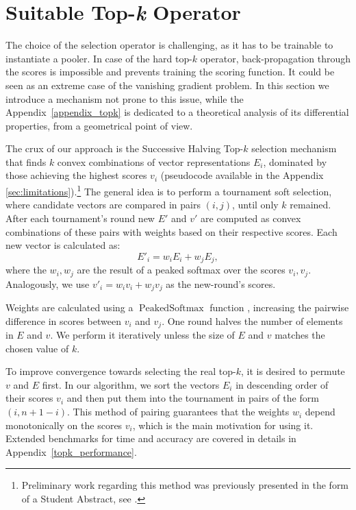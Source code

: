 \documentclass{article}
\begin{document}
\section{Suitable Top-\textit{k} Operator} \label{sec:topk}
The choice of the selection operator is challenging, as it has to be trainable to instantiate a pooler.
In case of the hard top-\(k\) operator,  back-propagation through the scores is impossible and prevents training the scoring function.  It could be seen as an extreme case of the vanishing gradient problem. In this section we introduce a mechanism not prone to this issue, while the Appendix~\ref{appendix_topk} is dedicated to a theoretical analysis of its differential properties, from a geometrical point of view.

The crux of our approach is the Successive Halving Top-$k$ selection mechanism
that finds $k$ convex combinations of vector representations $E_{i}$, dominated by those achieving the highest scores $v_{i}$ (pseudocode available in the Appendix \ref{sec:limitations}).\footnote{Preliminary work regarding this method was previously presented in the form of a Student Abstract, see \citet{pietruszka2020successive}.} The general idea is to perform a tournament soft selection, where candidate vectors are compared in pairs $(i, j)$, until only $k$ remained. After each tournament's round new $E'$ and $v'$ are computed as convex combinations of these pairs with weights based on their respective scores. Each new vector is calculated as:
\begin{equation*}
    E'_{i} = w_{i}E_{i} + w_{j}E_{j},
\end{equation*}
where the $w_i, w_j$ are the result of a peaked softmax over the scores $v_i, v_j$.
Analogously, we use $v'_{i} = w_{i}v_{i} + w_{j}v_{j}$ as the new-round's scores.


Weights are calculated using a $\operatorname{PeakedSoftmax}$ function \citep{goyal-etal-2017-differentiable}, increasing the pairwise difference in scores between $v_i$ and $v_j$. 
One round halves the number of elements in $E$ and $v$. We perform it iteratively unless the size of $E$ and $v$ matches the chosen value of $k$. 

To improve convergence towards selecting the real top-$k$, it is desired to permute $v$ and $E$ first. In our algorithm, we sort the vectors $E_{i}$ in descending order of their scores $v_{i}$ and then put them into the tournament in pairs of the form $(i, n+1-i)$. This method of pairing guarantees that the weights $w_i$ depend monotonically on the scores $v_i$, which is the main motivation for using it. Extended benchmarks for time and accuracy are covered in details in  Appendix~\ref{topk_performance}.
\end{document}
